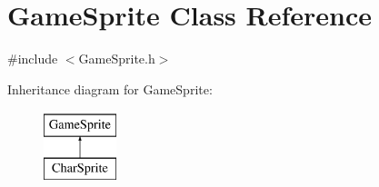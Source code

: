 \hypertarget{class_game_sprite}{}\section{Game\+Sprite Class Reference}
\label{class_game_sprite}


{\ttfamily \#include $<$Game\+Sprite.\+h$>$}

Inheritance diagram for Game\+Sprite\+:\begin{figure}[H]
\begin{center}
\leavevmode
\includegraphics[height=2.000000cm]{class_game_sprite}
\end{center}
\end{figure}
